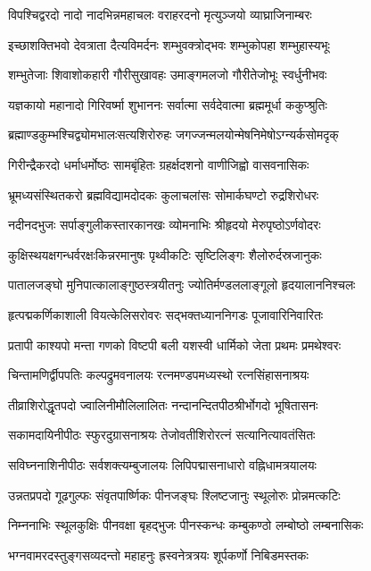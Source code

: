\twolineshloka
{विपश्चिद्वरदो नादो नादभिन्नमहाचलः}
{वराहरदनो मृत्युञ्जयो व्याघ्राजिनाम्बरः}%

\twolineshloka
{इच्छाशक्तिभवो देवत्राता दैत्यविमर्दनः}
{शम्भुवक्त्रोद्भवः शम्भुकोपहा शम्भुहास्यभूः}%

\twolineshloka
{शम्भुतेजाः शिवाशोकहारी गौरीसुखावहः}
{उमाङ्गमलजो गौरीतेजोभूः स्वर्धुनीभवः}%

\twolineshloka
{यज्ञकायो महानादो गिरिवर्ष्मा शुभाननः}
{सर्वात्मा सर्वदेवात्मा ब्रह्ममूर्धा ककुप्श्रुतिः}%

\twolineshloka
{ब्रह्माण्डकुम्भश्चिद्व्योमभालःसत्यशिरोरुहः}
{जगज्जन्मलयोन्मेषनिमेषोऽग्न्यर्कसोमदृक्}%

\twolineshloka
{गिरीन्द्रैकरदो धर्माधर्मोष्ठः सामबृंहितः}
{ग्रहर्क्षदशनो वाणीजिह्वो वासवनासिकः}%

\twolineshloka
{भ्रूमध्यसंस्थितकरो ब्रह्मविद्यामदोदकः}
{कुलाचलांसः सोमार्कघण्टो रुद्रशिरोधरः}%

\twolineshloka
{नदीनदभुजः सर्पाङ्गुलीकस्तारकानखः}
{व्योमनाभिः श्रीहृदयो मेरुपृष्ठोऽर्णवोदरः}%

\twolineshloka
{कुक्षिस्थयक्षगन्धर्वरक्षःकिन्नरमानुषः}
{पृथ्वीकटिः सृष्टिलिङ्गः शैलोरुर्दस्रजानुकः}%

\twolineshloka
{पातालजङ्घो मुनिपात्कालाङ्गुष्ठस्त्रयीतनुः}
{ज्योतिर्मण्डललाङ्गूलो हृदयालाननिश्चलः}%

\twolineshloka
{हृत्पद्मकर्णिकाशाली वियत्केलिसरोवरः}
{सद्भक्तध्याननिगडः पूजावारिनिवारितः}%

\twolineshloka
{प्रतापी काश्यपो मन्ता गणको विष्टपी बली}
{यशस्वी धार्मिको जेता प्रथमः प्रमथेश्वरः}%

\twolineshloka
{चिन्तामणिर्द्वीपपतिः कल्पद्रुमवनालयः}
{रत्नमण्डपमध्यस्थो रत्नसिंहासनाश्रयः}%

\twolineshloka
{तीव्राशिरोद्धृतपदो ज्वालिनीमौलिलालितः}
{नन्दानन्दितपीठश्रीर्भोगदो भूषितासनः}%

\twolineshloka
{सकामदायिनीपीठः स्फुरदुग्रासनाश्रयः}
{तेजोवतीशिरोरत्नं सत्यानित्यावतंसितः}%

\twolineshloka
{सविघ्ननाशिनीपीठः सर्वशक्त्यम्बुजालयः}
{लिपिपद्मासनाधारो वह्निधामत्रयालयः}%

\twolineshloka
{उन्नतप्रपदो गूढगुल्फः संवृतपार्ष्णिकः}
{पीनजङ्घः श्लिष्टजानुः स्थूलोरुः प्रोन्नमत्कटिः}%

\twolineshloka
{निम्ननाभिः स्थूलकुक्षिः पीनवक्षा बृहद्भुजः}
{पीनस्कन्धः कम्बुकण्ठो लम्बोष्ठो लम्बनासिकः}%

\twolineshloka
{भग्नवामरदस्तुङ्गसव्यदन्तो महाहनुः}
{ह्रस्वनेत्रत्रयः शूर्पकर्णो निबिडमस्तकः}%


